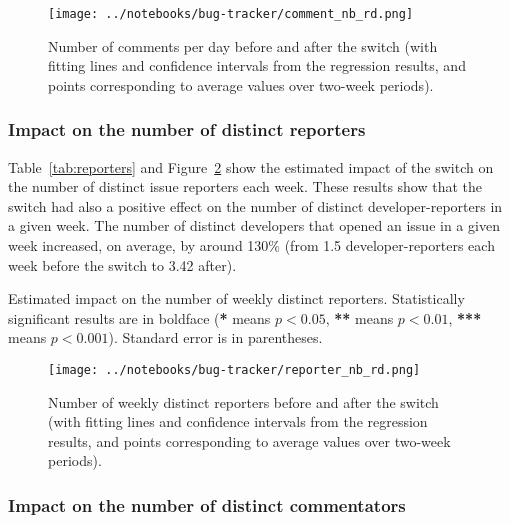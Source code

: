 \begin{figure}
	\begin{center}
		\texttt{[image: ../notebooks/bug-tracker/comment\_nb\_rd.png]}
		\caption{
			Number of comments per day before and after the switch (with fitting lines and confidence intervals from the regression results, and points corresponding to average values over two-week periods).
		}
		\label{comment_nb_rd}
	\end{center}
\end{figure}

\subsubsection{Impact on the number of distinct reporters}

Table~\ref{tab:reporters} and Figure~\ref{reporter_nb_rd} show the estimated impact of the switch on the number of distinct issue reporters each week.
These results show that the switch had also a positive effect on the number of distinct developer-reporters in a given week.
The number of distinct developers that opened an issue in a given week increased, on average, by around 130\% (from 1.5 developer-reporters each week before the switch to 3.42 after).

\begin{table}
	\begin{center}
		
		\caption{
			Estimated impact on the number of weekly distinct reporters.
			Statistically significant results are in boldface (\textbf{*} means $p<0.05$, \textbf{**} means $p<0.01$, \textbf{***} means $p<0.001$).
			Standard error is in parentheses.
		}
		\label{tab:reporters}
	\end{center}
\end{table}

\begin{figure}
	\begin{center}
		\texttt{[image: ../notebooks/bug-tracker/reporter\_nb\_rd.png]}
		\caption{Number of weekly distinct reporters before and after the switch (with fitting lines and confidence intervals from the regression results, and points corresponding to average values over two-week periods).} \label{reporter_nb_rd}
	\end{center}
\end{figure}

\subsubsection{Impact on the number of distinct commentators}


